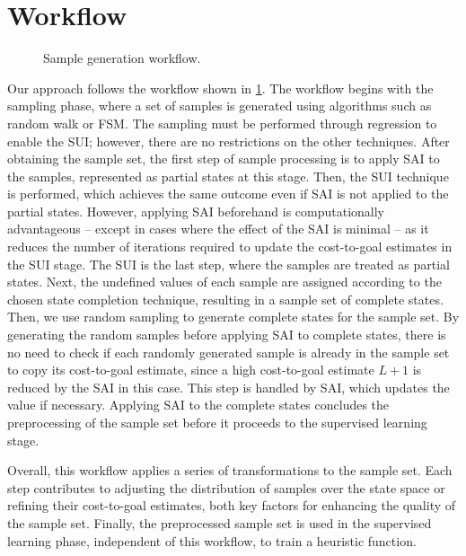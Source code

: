 \section{Workflow}
\label{sec:workflow}

\begin{figure}[tb]
    \caption{Sample generation workflow.}
    \label{fig:workflow}
    \addmargin
    \centering
    
\end{figure}

Our approach follows the workflow shown in \cref{fig:workflow}.
The workflow begins with the sampling phase, where a set of samples is generated using algorithms such as random walk or FSM. The sampling must be performed through regression to enable the SUI; however, there are no restrictions on the other techniques.
After obtaining the sample set, the first step of sample processing is to apply SAI to the samples, represented as partial states at this stage. Then, the SUI technique is performed, which achieves the same outcome even if SAI is not applied to the partial states. However, applying SAI beforehand is computationally advantageous -- except in cases where the effect of the SAI is minimal -- as it reduces the number of iterations required to update the cost-to-goal estimates in the SUI stage.
The SUI is the last step, where the samples are treated as partial states. Next, the undefined values of each sample are assigned according to the chosen state completion technique, resulting in a sample set of complete states.
Then, we use random sampling to generate complete states for the sample set. By generating the random samples before applying SAI to complete states, there is no need to check if each randomly generated sample is already in the sample set to copy its cost-to-goal estimate, since a high cost-to-goal estimate $L+1$ is reduced by the SAI in this case. This step is handled by SAI, which updates the value if necessary. Applying SAI to the complete states concludes the preprocessing of the sample set before it proceeds to the supervised learning stage.

Overall, this workflow applies a series of transformations to the sample set. Each step contributes to adjusting the distribution of samples over the state space or refining their cost-to-goal estimates, both key factors for enhancing the quality of the sample set. Finally, the preprocessed sample set is used in the supervised learning phase, independent of this workflow, to train a heuristic function.

